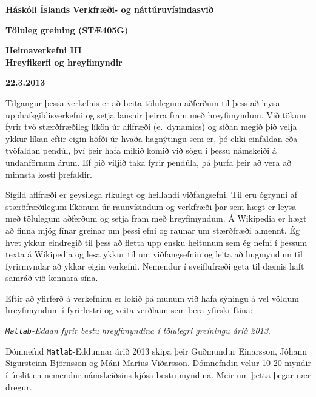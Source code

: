 \documentclass[11pt,icelandic]{article}
\begin{document}
\lstset{language=matlab}
\lstset{inputencoding=utf8/latin1}
{\large\bf Háskóli Íslands}  \hfill {\large \bf Verkfræði- og
náttúruvísindasvið}

\bigskip
\begin{center}
{\Large\bf  Töluleg greining (STÆ405G) }
\end{center}

\begin{center}{\Large \bf  Heimaverkefni III \\ \medskip
Hreyfikerfi og hreyfimyndir
}
\end{center}

\begin{center}{\bf 22.3.2013}
\end{center}

\noindent
Tilgangur þessa verkefnis er að beita tölulegum aðferðum til þess að
leysa upphafsgildisverkefni og setja lausnir þeirra fram með hreyfimyndum.
Við tökum fyrir tvö stærðfræðileg líkön úr aflfræði (e.~dynamics) og 
síðan megið þið velja ykkur líkan eftir eigin höfði úr hvaða
hagnýtingu sem er, þó ekki einfaldan eða tvöfaldan pendúl, því þeir 
hafa mikið komið við sögu í þessu námskeiði á  undanförnum árum.  
Ef þið viljið taka fyrir pendúla, þá þurfa þeir að vera að minnsta
kosti þrefaldir.


\smallskip
Sígild aflfræði er geysilega ríkulegt og heillandi viðfangsefni.
Til eru  ógrynni af stærðfræðilegum líkönum úr raunvísindum og verkfræði þar
sem hægt er leysa með tölulegum aðferðum og setja fram með
hreyfimyndum.  Á Wikipedia er hægt að finna 
mjög fínar greinar um þessi efni og raunar um stærðfræði almennt.  
Ég hvet ykkur 
eindregið til þess að fletta upp ensku heitunum sem ég nefni í þessum 
texta á Wikipedia og lesa ykkur til um viðfangsefnin og leita að 
hugmyndum til fyrirmyndar að ykkar eigin verkefni.  Nemendur í
sveiflufræði geta til dæmis haft samráð við kennara sína.


\smallskip
Eftir að yfirferð á verkefninu er lokið þá munum við hafa sýningu á
vel völdum hreyfimyndum í fyrirlestri og veita verðlaun
sem bera yfirskriftina:

\smallskip

\begin{center}
 {\Large \it {\tt Matlab}-Eddan
fyrir bestu hreyfimyndina í tölulegri greiningu árið 2013}.   
\end{center}

\smallskip
Dómnefnd {\tt Matlab}-Eddunnar árið 2013 skipa þeir 
Guðmundur Einarsson, Jóhann Sigursteinn Björnsson og 
Máni Maríus Viðarsson.
Dómnefndin velur 10-20 myndir í úrslit en nemendur námskeiðsins 
kjósa bestu myndina.  Meir um þetta þegar nær dregur.
\end{document}
